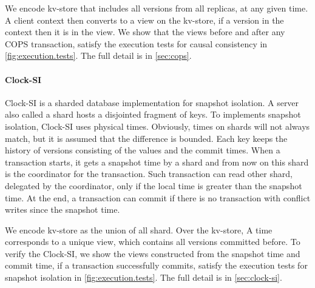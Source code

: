 We encode kv-store that includes all versions from all replicas, at any given time.
A client context then converts to a view on the kv-store, 
\ie if a version in the context then it is in the view.
We show that the views before and after any COPS transaction,
satisfy the execution tests for causal consistency in \cref{fig:execution.tests}.
The full detail is in \cref{sec:cops}.

\paragraph{\bf Clock-SI}
Clock-SI is a sharded database implementation for snapshot isolation.
A server also called a shard hosts a disjointed fragment of keys.
To implements snapshot isolation, Clock-SI uses physical times.
Obviously, times on shards will not always match, but it is assumed that the difference is bounded.
Each key keeps the history of versions consisting of the values and the commit times.
When a transaction starts, it gets a snapshot time by a shard 
and from now on this shard is the coordinator for the transaction.
Such transaction can read other shard, delegated by the coordinator, only if the local time is greater than the snapshot time.
At the end, a transaction can commit if there is no transaction with conflict writes since the snapshot time.

We encode kv-store as the union of all shard.
Over the kv-store, 
A time corresponds to a unique view,
which contains all versions committed before.
To verify the Clock-SI, 
we show the views constructed from the snapshot time and commit time,
if a transaction successfully commits, 
satisfy the execution tests for snapshot isolation in \cref{fig:execution.tests}.
The full detail is in \cref{sec:clock-si}.
